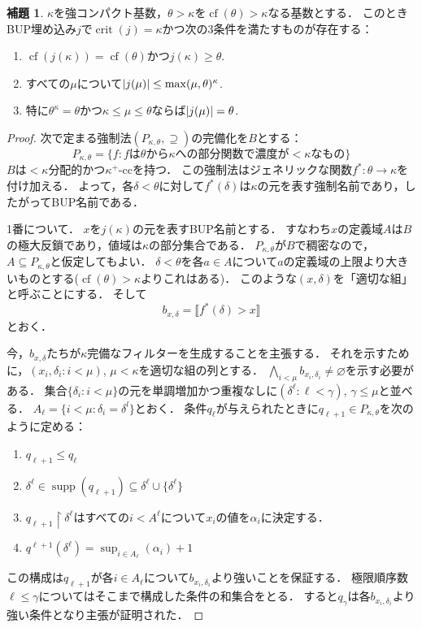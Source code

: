 \documentclass[uplatex,dvipdfmx]{jsarticle}
\newcommand{\cf}{\operatorname{cf}}
\newcommand{\crit}{\operatorname{crit}}
\newcommand{\supp}{\operatorname{supp}}
\DeclarePairedDelimiter\abs{\lvert}{\rvert}
\newcommand{\truth}[1]{\llbracket #1 \rrbracket}
\renewcommand\emptyset{\varnothing}
\renewcommand\subset{\subseteq}
\theoremstyle{definition}
\newtheorem{lem}[thm]{補題}
\begin{document}
	\begin{lem}
		$\kappa$を強コンパクト基数，$\theta > \kappa$を$\cf(\theta) > \kappa$なる基数とする．
		このときBUP埋め込み$j$で$\crit(j) = \kappa$かつ次の3条件を満たすものが存在する：
		\begin{enumerate}
			\item $\cf(j(\kappa)) = \cf(\theta)$かつ$j(\kappa) \ge \theta$.
			\item すべての$\mu$について$\abs{j(\mu)} \le \max(\mu, \theta)^\kappa$.
			\item 特に$\theta^\kappa = \theta$かつ$\kappa \le \mu \le \theta$ならば$\abs{j(\mu)} = \theta$.
		\end{enumerate}
	\end{lem}
	\begin{proof}
		次で定まる強制法$(P_{\kappa,\theta}, \supseteq)$の完備化を$B$とする：
		\[
			P_{\kappa,\theta} = \{ f : f\text{は}\theta\text{から}\kappa\text{への部分関数で濃度が}{<}\kappa\text{なもの} \}
		\]
		$B$は${<}\kappa$分配的かつ$\kappa^+$-ccを持つ．
		この強制法はジェネリックな関数$f^* \colon \theta \to \kappa$を付け加える．
		よって，各$\delta < \theta$に対して$f^*(\delta)$は$\kappa$の元を表す強制名前であり，したがってBUP名前である．

		1番について．
		$x$を$j(\kappa)$の元を表すBUP名前とする．
		すなわち$x$の定義域$A$は$B$の極大反鎖であり，値域は$\kappa$の部分集合である．
		$P_{\kappa,\theta}$が$B$で稠密なので，$A \subset P_{\kappa,\theta}$と仮定してもよい．
		$\delta < \theta$を各$a \in A$について$a$の定義域の上限より大きいものとする($\cf(\theta) > \kappa$よりこれはある)．
		このような$(x, \delta)$を「適切な組」と呼ぶことにする．
		そして
		\[
		b_{x,\delta} = \truth{ f^*(\delta) > x }	
		\]
		とおく．

		今，$b_{x,\delta}$たちが$\kappa$完備なフィルターを生成することを主張する．
		それを示すために，$(x_i, \delta_i : i < \mu)$, $\mu < \kappa$を適切な組の列とする．
		$\bigwedge_{i < \mu} b_{x_i, \delta_i} \ne \emptyset$を示す必要がある．
		集合$\{\delta_i : i < \mu\}$の元を単調増加かつ重複なしに$(\delta^\ell : \ell < \gamma)$, $\gamma \le \mu$と並べる．
		$A_\ell = \{ i < \mu : \delta_i = \delta^l \}$とおく．
		条件$q_\ell$が与えられたときに$q_{\ell+1} \in P_{\kappa, \theta}$を次のように定める：
		\begin{enumerate}
			\item $q_{\ell+1} \le q_{\ell}$
			\item $\delta^\ell \in \supp(q_{\ell+1}) \subset \delta^\ell \cup \{\delta^\ell \}$
			\item $q_{\ell+1} \upharpoonright \delta^\ell$はすべての$i < A^\ell$について$x_i$の値を$\alpha_i$に決定する．
			\item $q^{\ell+1}(\delta^\ell) = \sup_{i\in A_\ell}(\alpha_i)+1$
		\end{enumerate}
		この構成は$q_{\ell+1}$が各$i \in A_\ell$について$b_{x_i, \delta_i}$より強いことを保証する．
		極限順序数$\ell \le \gamma$についてはそこまで構成した条件の和集合をとる．
		すると$q_\gamma$は各$b_{x_i, \delta_i}$より強い条件となり主張が証明された．


\end{proof}
\end{document}
